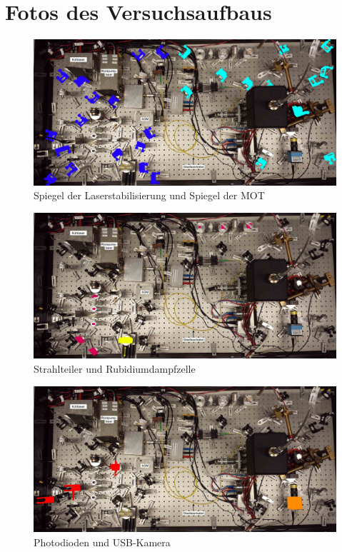 \documentclass[
class=book,
accentcolor=1b,
custommargins=geometry,
fontsize=11pt,
thesis={type=Versuchsanleitung},
ruledheaders=all,
headline=false,
instbox=false,
marginpar=false,
title=small,
ignore-missing-data=true,
twoside=false,
logofile=apqdesign/tuda_logo.pdf,
pdfa=false %
]{apqpub}
\begin{document}
					\chapter{Fotos des Versuchsaufbaus}				
					\begin{figure}[htb!]
						\centering
						\includegraphics[width=\textwidth]{graphics/SL.jpg}
						\caption{\textcolor[cmyk]{0.86,0.77,0,0}{Spiegel der Laserstabilisierung} und \textcolor[cmyk]{0.52,0,0.16,0}{Spiegel der MOT}}
						\label{fig:SL}
					\end{figure} 			
					\begin{figure}[htb!]
						\centering
						\includegraphics[width=\textwidth]{graphics/ST.jpg}
						\caption{\textcolor[cmyk]{0.11,1,0.47,0.01}{Strahlteiler} und \textcolor[cmyk]{0.1,0,0.99,0}{Rubidiumdampfzelle}}
						\label{fig:SW}
					\end{figure} 
					\begin{figure}[htb!]
						\centering
						\includegraphics[width=\textwidth]{graphics/PDUK.jpg}
						\caption{\textcolor[cmyk]{0,0.99,1,0}{Photodioden} und \textcolor[cmyk]{0,0.56,1,0}{USB-Kamera}}
						\label{fig:PD}
					\end{figure}
\end{document}
